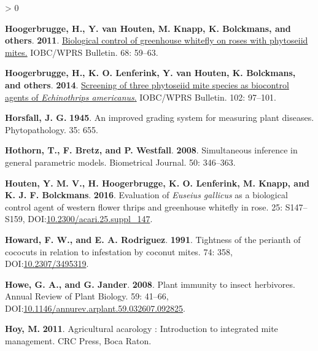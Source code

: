 \documentclass{ufdissertation}[overrideChapters] %
\newlength{\cslhangindent}
\newenvironment{CSLReferences}[2] %
 {%
  \setlength{\parindent}{0pt}
  \ifodd #1 \everypar{\setlength{\hangindent}{\cslhangindent}}\ignorespaces\fi
  \ifnum #2 > 0
  \setlength{\parskip}{#2\baselineskip}
  \fi
 }%
 {}
\begin{document}
{\begin{CSLReferences}{1}{1}
\leavevmode{}%
\textbf{Hoogerbrugge, H., Y. van Houten, M. Knapp, K. Bolckmans, and others}. \textbf{2011}. \href{http://www.iobc-wprs.org/pub/bulletins/bulletin_2011_68_table_of_contents_abstracts.pdf}{Biological control of greenhouse whitefly on roses with phytoseiid mites.} IOBC/WPRS Bulletin. 68: 59--63.

\leavevmode{}%
\textbf{Hoogerbrugge, H., K. O. Lenferink, Y. van Houten, K. Bolckmans, and others}. \textbf{2014}. \href{http://www.iobc-wprs.org/pub/bulletins/bulletin_2014_102_table_of_contents_abstracts.pdf}{Screening of three phytoseiid mite species as biocontrol agents of {\emph{Echinothrips americanus}}.} IOBC/WPRS Bulletin. 102: 97--101.

\leavevmode{}%
\textbf{Horsfall, J. G.} \textbf{1945}. An improved grading system for measuring plant diseases. Phytopathology. 35: 655.

\leavevmode{}%
\textbf{Hothorn, T., F. Bretz, and P. Westfall}. \textbf{2008}. Simultaneous inference in general parametric models. Biometrical Journal. 50: 346--363.

\leavevmode{}%
\textbf{Houten, Y. M. V., H. Hoogerbrugge, K. O. Lenferink, M. Knapp, and K. J. F. Bolckmans}. \textbf{2016}. Evaluation of {\emph{Euseius gallicus}} as a biological control agent of western flower thrips and greenhouse whitefly in rose. 25: S147--S159, DOI:\href{https://doi.org/10.2300/acari.25.suppl_147}{10.2300/acari.25.suppl\_147}.

\leavevmode{}%
\textbf{Howard, F. W., and E. A. Rodriguez}. \textbf{1991}. Tightness of the perianth of cococuts in relation to infestation by coconut mites. 74: 358, DOI:\href{https://doi.org/10.2307/3495319}{10.2307/3495319}.

\leavevmode{}%
\textbf{Howe, G. A., and G. Jander}. \textbf{2008}. Plant immunity to insect herbivores. Annual Review of Plant Biology. 59: 41--66, DOI:\href{https://doi.org/10.1146/annurev.arplant.59.032607.092825}{10.1146/annurev.arplant.59.032607.092825}.

\leavevmode{}%
\textbf{Hoy, M.} \textbf{2011}. Agricultural acarology : Introduction to integrated mite management. CRC Press, Boca Raton.


\end{CSLReferences}}
\end{document}
